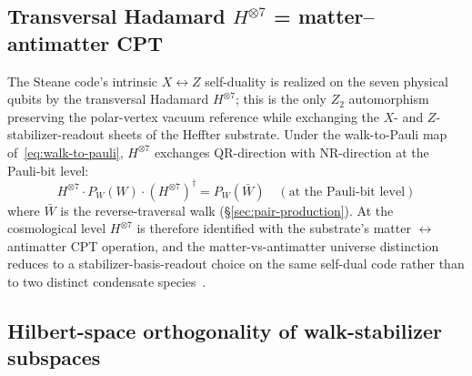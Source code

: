 \documentclass[11pt]{article}
\begin{document}
\subsection{Transversal Hadamard $H^{\otimes 7}$ = matter--antimatter CPT}
\label{sec:hadamard-cpt}

The Steane code's intrinsic $X \leftrightarrow Z$ self-duality is realized on the seven physical qubits by the transversal Hadamard $H^{\otimes 7}$; this is the only $Z_2$ automorphism preserving the polar-vertex vacuum reference while exchanging the $X$- and $Z$-stabilizer-readout sheets of the Heffter substrate.  Under the walk-to-Pauli map of~\eqref{eq:walk-to-pauli}, $H^{\otimes 7}$ exchanges QR-direction with NR-direction at the Pauli-bit level:
\begin{equation}
  H^{\otimes 7} \cdot P_W(W) \cdot (H^{\otimes 7})^\dagger = P_W(\bar W) \quad (\text{at the Pauli-bit level})
\end{equation}
where $\bar W$ is the reverse-traversal walk (\S\ref{sec:pair-production}).  At the cosmological level $H^{\otimes 7}$ is therefore identified with the substrate's matter $\leftrightarrow$ antimatter CPT operation, and the matter-vs-antimatter universe distinction reduces to a stabilizer-basis-readout choice on the same self-dual code rather than to two distinct condensate species~\cite{Paper25Memo}.

\subsection{Hilbert-space orthogonality of walk-stabilizer subspaces}
\label{sec:walk-orthogonality}
\end{document}
